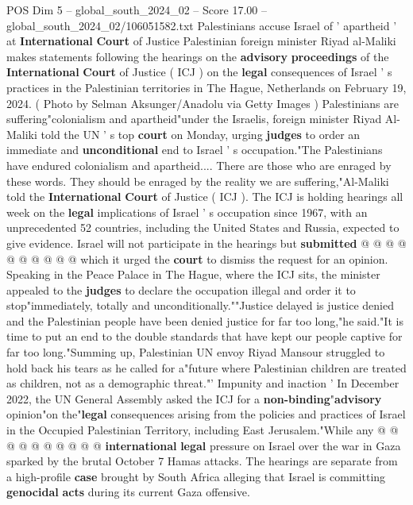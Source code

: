 \begin{textsample}{POS Dim 5 – global\_south\_2024\_02 – Score 17.00 – global\_south\_2024\_02/106051582.txt}  \label{ex:f5_pos_153}
Palestinians accuse Israel of ' apartheid ' at \textbf{International} \textbf{Court} of Justice Palestinian foreign minister Riyad al-Maliki makes statements following the hearings on the \textbf{advisory} \textbf{proceedings} of the \textbf{International} \textbf{Court} of Justice ( ICJ ) on the \textbf{legal} consequences of Israel ' s practices in the Palestinian territories in The Hague, Netherlands on February 19, 2024. ( Photo by Selman Aksunger/Anadolu via Getty Images ) Palestinians are suffering"colonialism and apartheid"under the Israelis, foreign minister Riyad Al-Maliki told the UN ' s top \textbf{court} on Monday, urging \textbf{judges} to order an immediate and \textbf{unconditional} end to Israel ' s occupation."The Palestinians have endured colonialism and apartheid....
There are those who are enraged by these words.
They should be enraged by the reality we are suffering,"Al-Maliki told the \textbf{International} \textbf{Court} of Justice ( ICJ ).
The ICJ is holding hearings all week on the \textbf{legal} implications of Israel ' s occupation since 1967, with an unprecedented 52 countries, including the United States and Russia, expected to give evidence.
Israel will not participate in the hearings but \textbf{submitted} @ @ @ @ @ @ @ @ @ @ which it urged the \textbf{court} to dismiss the request for an opinion.
Speaking in the Peace Palace in The Hague, where the ICJ sits, the minister appealed to the \textbf{judges} to declare the occupation illegal and order it to stop"immediately, totally and unconditionally.""Justice delayed is justice denied and the Palestinian people have been denied justice for far too long,"he said."It is time to put an end to the double standards that have kept our people captive for far too long."Summing up, Palestinian UN envoy Riyad Mansour struggled to hold back his tears as he called for a"future where Palestinian children are treated as children, not as a demographic threat."' Impunity and inaction ' In December 2022, the UN General Assembly asked the ICJ for a \textbf{non-binding}"\textbf{advisory} opinion"on the"\textbf{legal} consequences arising from the policies and practices of Israel in the Occupied Palestinian Territory, including East Jerusalem."While any @ @ @ @ @ @ @ @ @ @ \textbf{international} \textbf{legal} pressure on Israel over the war in Gaza sparked by the brutal October 7 Hamas attacks.
The hearings are separate from a high-profile \textbf{case} brought by South Africa alleging that Israel is committing \textbf{genocidal} \textbf{acts} during its current Gaza offensive.

\end{textsample}
